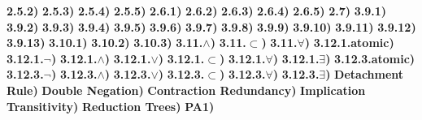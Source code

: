 \documentclass{article}
\begin{document}
{\bf 2.5.2)} 
{\bf 2.5.3)} 
{\bf 2.5.4)} 
\break
{\bf 2.5.5)} 
{\bf 2.6.1)} 
{\bf 2.6.2)} 
\break
{\bf 2.6.3)} 
{\bf 2.6.4)} 
{\bf 2.6.5)} 
{\bf 2.7)} 
{\bf 3.9.1)} 
{\bf 3.9.2)} 
{\bf 3.9.3)} 
{\bf 3.9.4)} 
{\bf 3.9.5)} 
{\bf 3.9.6)} 
\break
{\bf 3.9.7)} 
{\bf 3.9.8)} 
{\bf 3.9.9)} 
{\bf 3.9.10)} 
{\bf 3.9.11)} 
{\bf 3.9.12)} 
{\bf 3.9.13)} 
{\bf 3.10.1)} 
{\bf 3.10.2)} 
{\bf 3.10.3)} 
{\bf 3.11.$\land$)} 
{\bf 3.11.$\subset$)} 
{\bf 3.11.$\forall$)} 
\break
{\bf 3.12.1.atomic)} 
{\bf 3.12.1.$\neg$)} 
{\bf 3.12.1.$\land$)} 
{\bf 3.12.1.$\lor$)} 
{\bf 3.12.1.$\subset$)} 
\break
{\bf 3.12.1.$\forall$)} 
{\bf 3.12.1.$\exists$)} 
{\bf 3.12.3.atomic)} 
{\bf 3.12.3.$\neg$)} 
\break
{\bf 3.12.3.$\land$)} 
{\bf 3.12.3.$\lor$)} 
{\bf 3.12.3.$\subset$)} 
{\bf 3.12.3.$\forall$)} 
\break
{\bf 3.12.3.$\exists$)} 
\break
{\bf Detachment Rule)} 
{\bf Double Negation)} 
{\bf Contraction Redundancy)} 
{\bf Implication Transitivity)} 
\break
{\bf Reduction Trees)} 
\break
{\bf PA1)} 
\end{document}
